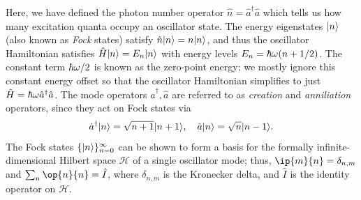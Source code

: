Here, we have defined the photon number operator $\hat{n} = \hat{a}^\dagger\hat{a}$ which tells us how many excitation quanta occupy an oscillator state. The energy eigenstates $\lvert n\rangle$ (also known as \textit{Fock} states) satisfy $\hat{n}\lvert n\rangle = n\lvert n\rangle$, and thus the oscillator Hamiltonian satisfies $\hat{H}\lvert n\rangle = E_n\lvert n\rangle$ with energy levels $E_n = \hbar\omega(n + 1/2)$. The constant term $\hbar\omega/2$ is known as the zero-point energy; we mostly ignore this constant energy offset so that the oscillator Hamiltonian simplifies to just $\hat{H} = \hbar\omega \hat{a}^\dagger\hat{a}$. The mode operators $\hat{a}^\dagger, \hat{a}$ are referred to as \textit{creation} and \textit{anniliation} operators, since they act on Fock states via
\begin{equation}
    \hat{a}^\dagger\lvert n\rangle = \sqrt{n+1}\lvert n+1\rangle, \quad \hat{a}\lvert n\rangle = \sqrt{n}\lvert n-1\rangle.
\end{equation}
The Fock states $\{\lvert n\rangle\}_{n=0}^\infty$ can be shown to form a basis for the formally infinite-dimensional Hilbert space $\mathcal{H}$ of a single oscillator mode; thus, $\ip{m}{n} = \delta_{n, m}$ and $\sum_n \op{n}{n} = \hat{I}$, where $\delta_{n, m}$ is the Kronecker delta, and $\hat{I}$ is the identity operator on $\mathcal{H}$. 

